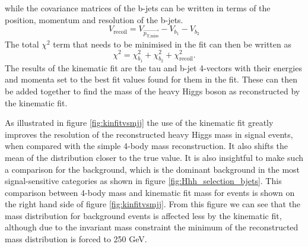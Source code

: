 while the covariance matrices of the b-jets can be written in terms of the position, momentum and resolution of the b-jets. 
~\vspace{-0.5\baselineskip}
\begin{equation}\label{eqn:kinfit_recoilcov}
V_{\text{recoil}} = V_{\vec{p_{\text{T,miss}}}} - V_{b_{1}} - V_{b_2} 
\end{equation}
The total $\chi^2$ term that needs to be minimised in the fit can then be written as
~\vspace{-0.5\baselineskip}
\begin{equation}\label{eqn:kinfit_chitot}
\chi^2 = \chi^2_{b_1} + \chi^2_{b_2} + \chi^2_{\text{recoil}}.
\end{equation}
The results of the kinematic fit are the tau and b-jet 4-vectors with their energies and momenta
set to the best fit values found for them in the fit. These can then be added together to find
the mass of the heavy Higgs boson as reconstructed by the kinematic fit.

As illustrated in figure \ref{fig:kinfitvsmjj} the use of the kinematic fit greatly
improves the resolution of the reconstructed heavy Higgs mass in signal events, when 
compared with the simple 4-body mass reconstruction. It also shifts the mean of the
distribution closer to the true value. It is also insightful to make such a comparison
for the \ttbar background, which is the dominant background in the most signal-sensitive categories as 
shown in figure \ref{fig:Hhh_selection_bjets}. This comparison between 4-body mass and
kinematic fit mass for \ttbar events is shown on the right hand side of figure 
\ref{fig:kinfitvsmjj}. From this figure we can see that the mass distribution for
background events is affected less by the kinematic fit, although due to the
invariant mass constraint the minimum of the reconstructed mass distribution
is forced to 250 GeV.

